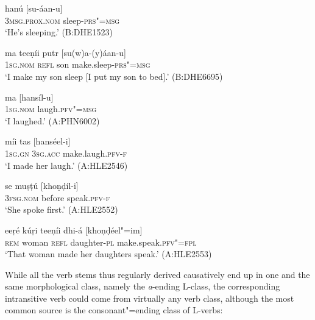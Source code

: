 \begin{exe}
\ex
\label{ex:8-7}
\gll hanú [su-áan-u] \\
\textsc{3msg.prox.nom} sleep-\textsc{prs"=msg} \\
\glt `He's sleeping.' (B:DHE1523)
\end{exe}
\begin{exe}
\ex
\label{ex:8-8}
\gll ma teeṇíi putr [su(w)a-(y)áan-u]  \\
\textsc{1sg.nom} \textsc{refl} son make.sleep-\textsc{prs"=msg} \\
\glt `I make my son sleep [I put my son to bed].' (B:DHE6695)
\end{exe}
\begin{exe}
\ex
\label{ex:8-9}
\gll ma [hansíl-u] \\
\textsc{1sg.nom} laugh.\textsc{pfv"=msg} \\
\glt `I laughed.' (A:PHN6002)
\end{exe}
\begin{exe}
\ex
\label{ex:8-10}
\gll míi tas [hanséel-i] \\
\textsc{1sg.gn} \textsc{3sg.acc} make.laugh.\textsc{pfv-f} \\
\glt `I made her laugh.' (A:HLE2546)
\end{exe}
\begin{exe}
\ex
\label{ex:8-11}
\gll se muṣṭú [khoṇḍíl-i] \\
\textsc{3fsg.nom} before speak.\textsc{pfv-f} \\
\glt `She spoke first.' (A:HLE2552)
\end{exe}
\begin{exe}
\ex
\label{ex:8-12}
\gll eeṛé kúṛi teeṇíi dhi-á [khoṇḍéel"=im] \\
\textsc{rem} woman \textsc{refl} daughter-\textsc{pl} make.speak.\textsc{pfv"=fpl} \\
\glt `That woman made her daughters speak.' (A:HLE2553)
\end{exe}

While all the verb stems thus regularly derived causatively end up in one and the same morphological class, namely the \textit{a}-ending L-class, the corresponding intransitive verb could come from virtually any verb class, although the most common source is the consonant"=ending class of L-verbs:


